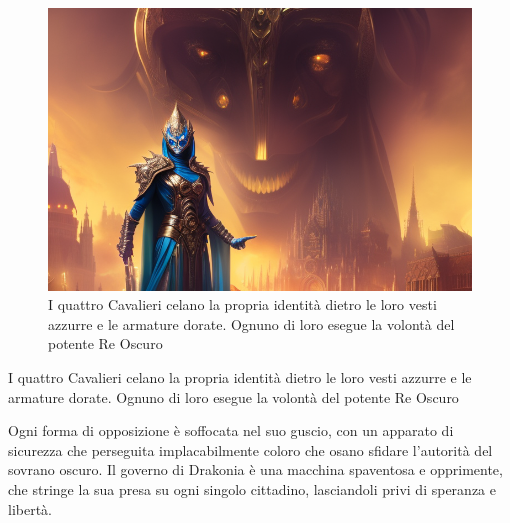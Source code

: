 \begin{figure}
\centering
\includegraphics{lich_e_cazzi.png}
\caption{I quattro Cavalieri celano la propria identità dietro le loro
vesti azzurre e le armature dorate. Ognuno di loro esegue la volontà del
potente Re Oscuro}
\end{figure}

I quattro Cavalieri celano la propria identità dietro le loro vesti
azzurre e le armature dorate. Ognuno di loro esegue la volontà del
potente Re Oscuro

Ogni forma di opposizione è soffocata nel suo guscio, con un apparato di
sicurezza che perseguita implacabilmente coloro che osano sfidare
l'autorità del sovrano oscuro. Il governo di Drakonia è una macchina
spaventosa e opprimente, che stringe la sua presa su ogni singolo
cittadino, lasciandoli privi di speranza e libertà.

